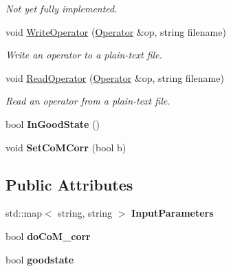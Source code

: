\begin{DoxyCompactItemize}
\begin{DoxyCompactList}\small\item\em Not yet fully implemented. \end{DoxyCompactList}\item 
\hypertarget{classReadWrite_a771ed1ac7ca0cc9cb6a209da170dd351}{void \hyperlink{classReadWrite_a771ed1ac7ca0cc9cb6a209da170dd351}{Write\-Operator} (\hyperlink{classOperator}{Operator} \&op, string filename)}\label{classReadWrite_a771ed1ac7ca0cc9cb6a209da170dd351}

\begin{DoxyCompactList}\small\item\em Write an operator to a plain-\/text file. \end{DoxyCompactList}\item 
\hypertarget{classReadWrite_ab924c67864c7af28bcc22a9b87abafb3}{void \hyperlink{classReadWrite_ab924c67864c7af28bcc22a9b87abafb3}{Read\-Operator} (\hyperlink{classOperator}{Operator} \&op, string filename)}\label{classReadWrite_ab924c67864c7af28bcc22a9b87abafb3}

\begin{DoxyCompactList}\small\item\em Read an operator from a plain-\/text file. \end{DoxyCompactList}\item 
\hypertarget{classReadWrite_a05ec8e21842e94d788bb36c7d11f46b9}{bool {\bfseries In\-Good\-State} ()}\label{classReadWrite_a05ec8e21842e94d788bb36c7d11f46b9}

\item 
\hypertarget{classReadWrite_a5e81dd4ce4adfe6fc08af81440003bb9}{void {\bfseries Set\-Co\-M\-Corr} (bool b)}\label{classReadWrite_a5e81dd4ce4adfe6fc08af81440003bb9}

\end{DoxyCompactItemize}
\subsection*{Public Attributes}
\begin{DoxyCompactItemize}
\item 
\hypertarget{classReadWrite_aa99ba50a35d8391285c1bdde1f1c206d}{std\-::map$<$ string, string $>$ {\bfseries Input\-Parameters}}\label{classReadWrite_aa99ba50a35d8391285c1bdde1f1c206d}

\item 
\hypertarget{classReadWrite_a3221f4b824dc385b066eca732339ee72}{bool {\bfseries do\-Co\-M\-\_\-corr}}\label{classReadWrite_a3221f4b824dc385b066eca732339ee72}

\item 
\hypertarget{classReadWrite_aaf2753e15a5e7f524d6fde9f15ab357b}{bool {\bfseries goodstate}}\label{classReadWrite_aaf2753e15a5e7f524d6fde9f15ab357b}

\end{DoxyCompactItemize}


